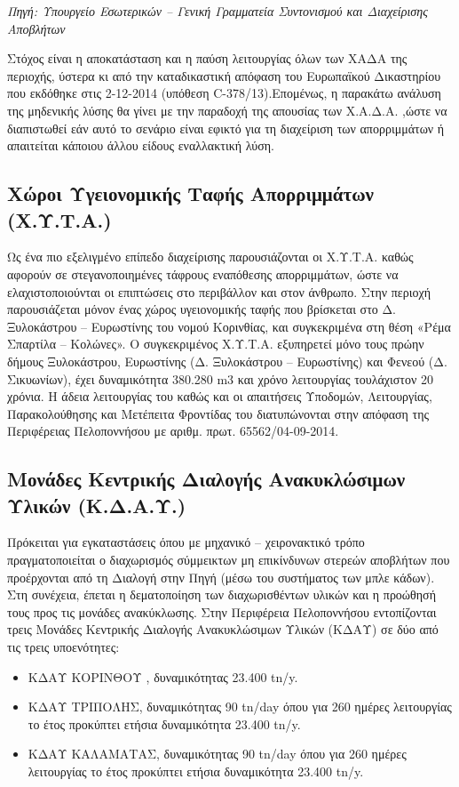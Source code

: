 \documentclass[12pt]{article}
\newcommand{\gr}{\selectlanguage{greek}}
\newcommand{\eng}{\selectlanguage{english}}
\begin{document}
	\emph{Πηγή: Υπουργείο Εσωτερικών – Γενική Γραμματεία Συντονισμού και Διαχείρισης Αποβλήτων}
	
	Στόχος είναι η αποκατάσταση και η παύση λειτουργίας όλων των ΧΑΔΑ της περιοχής, ύστερα κι από την καταδικαστική απόφαση του Ευρωπαϊκού Δικαστηρίου που εκδόθηκε στις 2-12-2014 (υπόθεση \eng C-378/13).\gr Επομένως, η παρακάτω ανάλυση της μηδενικής λύσης θα γίνει με την παραδοχή της απουσίας των Χ.Α.Δ.Α. ,ώστε να διαπιστωθεί εάν αυτό το σενάριο είναι εφικτό για τη διαχείριση των απορριμμάτων ή απαιτείται κάποιου άλλου είδους εναλλακτική λύση.
	
	\subsection{Χώροι Υγειονομικής Ταφής Απορριμμάτων (Χ.Υ.Τ.Α.)}
	
	Ως ένα πιο εξελιγμένο επίπεδο διαχείρισης παρουσιάζονται  οι Χ.Υ.Τ.Α. καθώς αφορούν σε στεγανοποιημένες τάφρους εναπόθεσης απορριμμάτων, ώστε να ελαχιστοποιούνται οι επιπτώσεις στο περιβάλλον και στον άνθρωπο. Στην περιοχή παρουσιάζεται μόνον ένας χώρος υγειονομικής ταφής που βρίσκεται στο Δ. Ξυλοκάστρου – Ευρωστίνης του νομού Κορινθίας, και συγκεκριμένα στη θέση «Ρέμα Σπαρτίλα – Κολώνες». Ο συγκεκριμένος Χ.Υ.Τ.Α. εξυπηρετεί μόνο τους πρώην δήμους Ξυλοκάστρου, Ευρωστίνης (Δ. Ξυλοκάστρου – Ευρωστίνης) και Φενεού (Δ. Σικυωνίων), έχει δυναμικότητα 380.280 m3 και χρόνο λειτουργίας  τουλάχιστον 20 χρόνια. Η άδεια λειτουργίας του καθώς και  οι απαιτήσεις Υποδομών, Λειτουργίας, Παρακολούθησης και Μετέπειτα Φροντίδας του διατυπώνονται στην απόφαση της Περιφέρειας Πελοποννήσου με αριθμ. πρωτ. 65562/04-09-2014.
	
	\subsection{Μονάδες Κεντρικής Διαλογής Ανακυκλώσιμων Υλικών (Κ.Δ.Α.Υ.)}
	
	Πρόκειται για εγκαταστάσεις όπου με μηχανικό – χειρονακτικό τρόπο πραγματοποιείται ο διαχωρισμός σύμμεικτων μη επικίνδυνων στερεών αποβλήτων που προέρχονται από τη Διαλογή στην Πηγή (μέσω του συστήματος των μπλε κάδων). Στη συνέχεια, έπεται η δεματοποίηση των διαχωρισθέντων υλικών και η προώθησή τους προς τις μονάδες ανακύκλωσης. Στην Περιφέρεια Πελοποννήσου εντοπίζονται τρεις Μονάδες Κεντρικής Διαλογής Ανακυκλώσιμων Υλικών (ΚΔΑΥ) σε δύο από τις τρεις υποενότητες:
	
	\begin{itemize}
		\item ΚΔΑΥ ΚΟΡΙΝΘΟΥ , δυναμικότητας 23.400 tn/y.
		\item ΚΔΑΥ ΤΡΙΠΟΛΗΣ, δυναμικότητας 90 tn/day όπου για 260 ημέρες λειτουργίας το έτος προκύπτει ετήσια δυναμικότητα 23.400 tn/y.
		\item ΚΔΑΥ ΚΑΛΑΜΑΤΑΣ, δυναμικότητας 90 tn/day όπου για 260 ημέρες λειτουργίας το έτος προκύπτει ετήσια δυναμικότητα  23.400 tn/y.
	\end{itemize}
\end{document}

